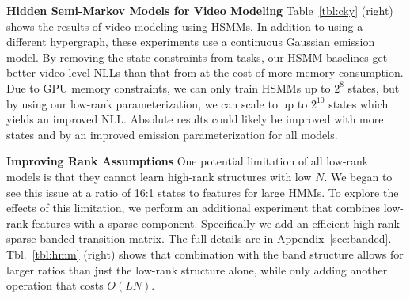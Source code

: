 \documentclass{article}
\begin{document}
\textbf{Hidden Semi-Markov Models for Video Modeling} Table~\ref{tbl:cky} (right) shows the results of video modeling using HSMMs. In addition to using a different hypergraph, these experiments use a continuous Gaussian emission model. By removing the state constraints from tasks, our HSMM baselines get better video-level NLLs than that from \citet{fried2020learning} at the cost of more memory consumption. Due to GPU memory constraints, we can only train HSMMs up to $2^8$ states, but by using our low-rank parameterization, we can scale to up to $2^{10}$ states which yields an improved NLL. Absolute results could likely be improved with more states and by an improved emission parameterization for all models.

\textbf{Improving Rank Assumptions}
One potential limitation of all low-rank models is that they cannot learn high-rank structures with low $N$.
We began to see this issue at a ratio of 16:1 states to features for large HMMs.
To explore the effects of this limitation, we perform an additional experiment that combines low-rank features with a sparse component. Specifically we add an efficient high-rank sparse banded transition matrix. 
The full details are in Appendix~\ref{sec:banded}.
Tbl.~\ref{tbl:hmm} (right) shows that combination with the band structure allows for larger ratios than just the low-rank structure alone, while only adding another operation that costs $O(LN)$.
\end{document}
